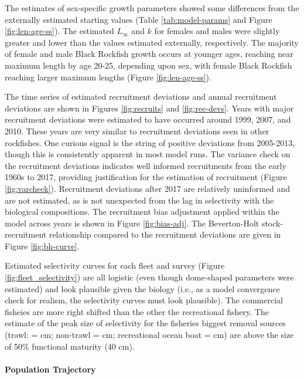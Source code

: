 \documentclass[11pt,
  letterpaper,
]{article}
\begin{document}
The estimates of sex-specific growth parameters showed some differences from the externally estimated starting values (Table \ref{tab:model-params} and Figure \ref{fig:len-age-ss}). The estimated \(L_{\infty}\) and \(k\) for females and males were slightly greater and lower than the values estimated externally, respectively. The majority of female and male Black Rockfish growth occurs at younger ages, reaching near maximum length by age 20-25, depending upon sex, with female Black Rockfish reaching larger maximum lengths (Figure \ref{fig:len-age-ss}).

The time series of estimated recruitment deviations and annual recruitment deviations are shown in Figures \ref{fig:recruits} and \ref{fig:rec-devs}. Years with major recruitment deviations were estimated to have occurred around 1999, 2007, and 2010. These years are very similar to recruitment deviations seen in other rockfishes. One curious signal is the string of positive deviations from 2005-2013, though this is consistently apparent in most model runs. The variance check on the recruitment deviations indicates well informed recruitments from the early 1960s to 2017, providing justification for the estimation of recruitment (Figure \ref{fig:varcheck}). Recruitment deviations after 2017 are relatively uninformed and are not estimated, as is not unexpected from the lag in selectivity with the biological compositions. The recruitment bias adjustment applied within the model across years is shown in Figure \ref{fig:bias-adj}. The Beverton-Holt stock-recruitment relationship compared to the recruitment deviations are given in Figure \ref{fig:bh-curve}.

Estimated selectivity curves for each fleet and survey (Figure \ref{fig:fleet_selectivity}) are all logistic (even though dome-shaped parameters were estimated) and look plausible given the biology (i.e., as a model convergence check for realism, the selectivity curves must look plausible). The commercial fisheies are more right shifted than the other the recreational fishery. The estimate of the peak size of selectivity for the fisheries biggest removal sources (trawl: = cm; non-trawl = cm; recreational ocean boat = cm) are above the size of 50\% functional maturity (40 cm).

\hypertarget{population-trajectory}{%
\paragraph{Population Trajectory}\label{population-trajectory}}
\end{document}
